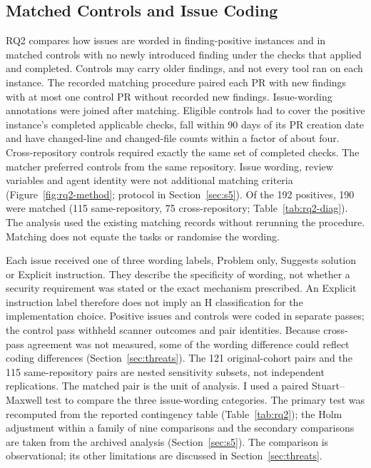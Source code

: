 \documentclass[acmsmall,screen,nonacm]{acmart}
\begin{document}
\subsection{Matched Controls and Issue Coding}\label{sec:rq2-design}

RQ2 compares how issues are worded in finding-positive instances and in matched controls with no newly introduced finding under the checks that applied and completed. Controls may carry older findings, and not every tool ran on each instance. The recorded matching procedure paired each PR with new findings with at most one control PR without recorded new findings. Issue-wording annotations were joined after matching. Eligible controls had to cover the positive instance's completed applicable checks, fall within 90 days of its PR creation date and have changed-line and changed-file counts within a factor of about four. Cross-repository controls required exactly the same set of completed checks. The matcher preferred controls from the same repository. Issue wording, review variables and agent identity were not additional matching criteria (Figure~\ref{fig:rq2-method}; protocol in Section~\ref{sec:s5}). Of the 192 positives, 190 were matched (115 same-repository, 75 cross-repository; Table~\ref{tab:rq2-diag}). The analysis used the existing matching records without rerunning the procedure. Matching does not equate the tasks or randomise the wording.

Each issue received one of three wording labels, Problem only, Suggests solution or Explicit instruction. They describe the specificity of wording, not whether a security requirement was stated or the exact mechanism prescribed. An Explicit instruction label therefore does not imply an H classification for the implementation choice. Positive issues and controls were coded in separate passes; the control pass withheld scanner outcomes and pair identities. Because cross-pass agreement was not measured, some of the wording difference could reflect coding differences (Section~\ref{sec:threats}). The 121 original-cohort pairs and the 115 same-repository pairs are nested sensitivity subsets, not independent replications. The matched pair is the unit of analysis. I used a paired Stuart--Maxwell test to compare the three issue-wording categories. The primary test was recomputed from the reported contingency table (Table~\ref{tab:rq2}); the Holm adjustment within a family of nine comparisons and the secondary comparisons are taken from the archived analysis (Section~\ref{sec:s5}). The comparison is observational; its other limitations are discussed in Section~\ref{sec:threats}.
\end{document}
